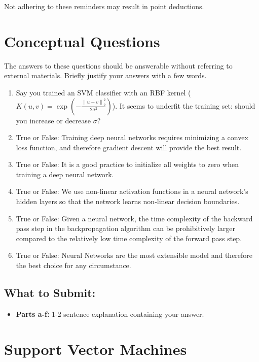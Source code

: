 \documentclass{article}
\begin{document}
Not adhering to these reminders may result in point deductions. \\

\clearpage{}

\section*{Conceptual Questions}
\begin{aprob}
    The answers to these questions should be answerable without referring to external materials. Briefly justify your answers with a few words.
    \begin{enumerate}
        \item {} Say you trained an SVM classifier with an RBF kernel ($K(u, v) = \exp\left(-\frac{\left\|u-v\right\|^2_2}{2\sigma^2}\right)$). It seems to underfit the training set: should you increase or decrease $\sigma$?
        \item {} True or False:   Training deep neural networks requires minimizing a convex loss function, and therefore gradient descent will provide the best result.
        \item {} True or False: It is a good practice to initialize all weights to zero when training a deep neural network.
        \item {} True or False:   We use non-linear activation functions in a neural network’s hidden layers so that the network learns non-linear decision boundaries.
        \item {} True or False: Given a neural network, the time complexity of the backward pass step in the backpropagation algorithm can be prohibitively larger compared to the relatively low time complexity of the forward pass step.
        \item {} True or False: Neural Networks are the most extensible model and therefore the best choice for any circumstance.
    \end{enumerate}
    \subsection*{What to Submit:}
    \begin{itemize}
        \item \textbf{Parts a-f:} 1-2 sentence explanation containing your answer.
    \end{itemize}
\end{aprob}

\section*{Support Vector Machines}
\end{document}
